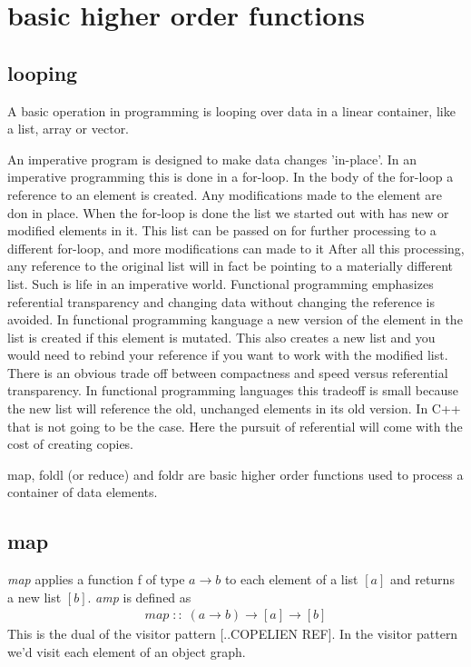 \documentclass[12pt,fleqn]{article}
\begin{document}
\section*{basic higher order functions}
\subsection*{looping}
A basic operation in programming is looping over data in a linear container, like a list, array or vector. 

An imperative program is designed to make data changes 'in-place'. 
In an imperative programming this is done in a for-loop.
In the body of the for-loop a reference to an element is created.
Any modifications made to the element are don in place.
When the for-loop is done the list we started out with has new or modified elements in it.
This list can be passed on for further processing to a different for-loop, and more modifications can made to it
After all this processing, any reference to the original list will in fact be pointing to a materially different list.
Such is life in an imperative world.
Functional programming emphasizes referential transparency and changing data without changing the reference is avoided.
In functional programming kanguage a new version of the element in the list is created if this element is mutated.
This also creates a new list and you would need to rebind your reference if you want to work with the modified list.
There is an obvious trade off between compactness and speed versus referential transparency.
In functional programming languages this tradeoff is small because the new list will reference the old, unchanged elements in its old version.
In C++ that is not going to be the case.  Here the pursuit of referential will come with the cost of creating copies. 

map, foldl (or reduce) and foldr are basic higher order functions used to process a container of data elements.
\subsection*{map}
{\em map} applies a function f of type $a \rightarrow b$ to each element of a list $[a]$ and returns a new list $[b]$. 
{\em amp} is defined as
\begin{eqnarray*}
map \;::\; (a \rightarrow b) \rightarrow [a] \rightarrow [b]
\end{eqnarray*}
This is the dual of the visitor pattern [..COPELIEN REF]. In the visitor pattern we'd visit each element of an object graph. 
\end{document}
